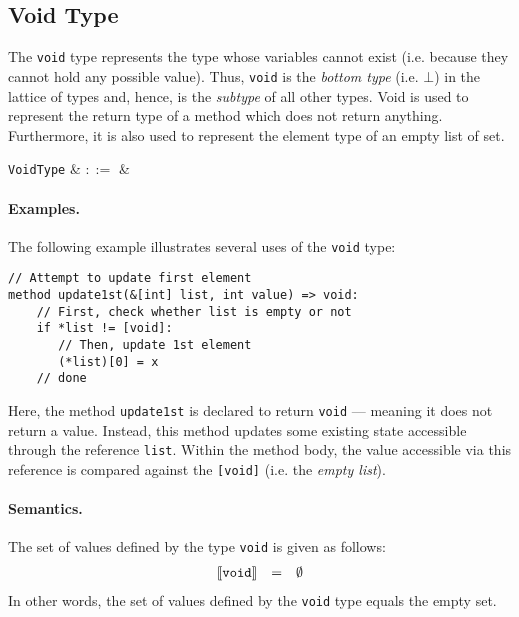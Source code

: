 
\subsection{Void Type}

The \lstinline{void} type represents the type whose variables cannot exist (i.e. because they cannot hold any possible value).  Thus, \lstinline{void} is the {\em bottom type} (i.e. $\bot$) in the lattice of types and, hence, is the {\em subtype} of all other types.  Void is used to represent the return type of a method which does not return anything.  Furthermore, it is also used to represent the element type of an empty list of set. 

\begin{syntax}
   \verb+VoidType+ & $::=$ &  \\
\end{syntax}

\paragraph{Examples.} The following example illustrates several uses of the \lstinline{void} type:

\begin{lstlisting}
// Attempt to update first element
method update1st(&[int] list, int value) => void:
    // First, check whether list is empty or not
    if *list != [void]:
       // Then, update 1st element
       (*list)[0] = x
    // done
\end{lstlisting}

Here, the method \lstinline{update1st} is declared to return
\lstinline{void} --- meaning it does not return a value.  Instead,
this method updates some existing state accessible through the
reference \lstinline{list}.  Within the method body, the value
accessible via this reference is compared against the
\lstinline{[void]} (i.e. the {\em empty list}).

\paragraph{Semantics.}  The set of values defined by the type
\lstinline{void} is given as follows:
\begin{displaymath}
\begin{array}{rcl}
\llbracket{\tt void}\rrbracket & = & \emptyset\\
\end{array}
\end{displaymath}
In other words, the set of values defined by the \lstinline{void} type
equals the empty set.

